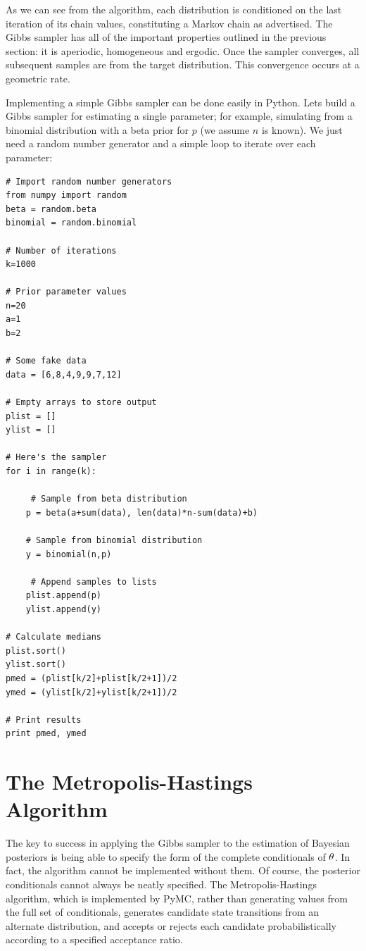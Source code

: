 \documentclass[]{book}
\begin{document}
As we can see from the algorithm, each distribution is conditioned on the last iteration of its chain values, constituting a Markov chain as advertised. The Gibbs sampler has all of the important properties outlined in the previous section: it is aperiodic, homogeneous and ergodic. Once the sampler converges, all subsequent samples are from the target distribution. This convergence occurs at a geometric rate. 

Implementing a simple Gibbs sampler can be done easily in Python. Lets build a Gibbs sampler for estimating a single parameter; for example, simulating from a binomial distribution with a beta prior for $p$ (we assume $n$ is known). We just need a random number generator and a simple loop to iterate over each parameter:
\vspace{1cm}
\begin{verbatim}
# Import random number generators
from numpy import random
beta = random.beta
binomial = random.binomial

# Number of iterations
k=1000

# Prior parameter values
n=20
a=1
b=2

# Some fake data
data = [6,8,4,9,9,7,12]

# Empty arrays to store output
plist = []
ylist = []

# Here's the sampler
for i in range(k):

	 # Sample from beta distribution
    p = beta(a+sum(data), len(data)*n-sum(data)+b)

    # Sample from binomial distribution
    y = binomial(n,p)

	 # Append samples to lists
    plist.append(p)
    ylist.append(y) 
    
# Calculate medians
plist.sort()
ylist.sort()
pmed = (plist[k/2]+plist[k/2+1])/2 
ymed = (ylist[k/2]+ylist[k/2+1])/2

# Print results
print pmed, ymed
\end{verbatim}
\vspace{1cm}

\section{The Metropolis-Hastings Algorithm}

The key to success in applying the Gibbs sampler to the estimation of Bayesian posteriors is being able to specify the form of the complete conditionals of ${\bf \theta}$. In fact, the algorithm cannot be implemented without them. Of course, the posterior conditionals cannot always be neatly specified. The Metropolis-Hastings algorithm, which is implemented by PyMC, rather than generating values from the full set of conditionals, generates candidate state transitions from an alternate distribution, and accepts or rejects each candidate probabilistically according to a specified acceptance ratio.
\end{document}
